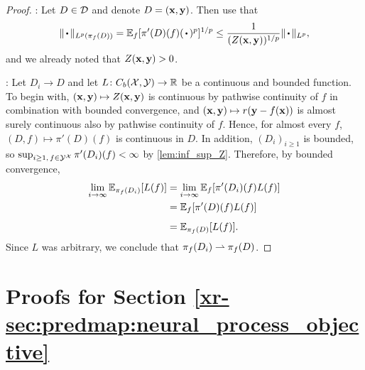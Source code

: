 \documentclass[12pt, twoside]{report}
\newcommand{\xrprefix}[1]{xr-#1}
\begin{document}
\begin{proof}
    :
    Let $D \in \mathcal{D}$ and denote $D = (\mathbf{x}, \mathbf{y})$.
    Then use that
    \begin{equation}
        \norm{\vardot}_{L^p(\pi_f(D))}
        = \E_f[\pi'(D)(f)(\vardot)^p]^{1/p}
        \le \frac{1}{(Z(\vx, \vy))^{1/p}} \norm{\vardot}_{L^p},
    \end{equation}
    and we already noted that $Z(\mathbf{x}, \mathbf{y}) > 0$.

    :
    Let $D_i \to D$ and let $L\colon C_b(\mathcal{X}, \mathcal{Y}) \to \mathbb{R}$ be a continuous and bounded function.
    To begin with, $(\mathbf{x}, \mathbf{y}) \mapsto Z(\mathbf{x}, \mathbf{y})$ is continuous by pathwise continuity of $f$ in combination with bounded convergence, and $(\mathbf{x}, \mathbf{y}) \mapsto r(\mathbf{y} - f(\mathbf{x}))$ is almost surely continuous also by pathwise continuity of $f$.
    Hence, for almost every $f$, $(D, f) \mapsto \pi'(D)(f)$ is continuous in $D$.
    In addition, $(D_i)_{i \ge 1}$ is bounded, so
    $\operatorname*{sup}_{i \ge 1,\, f \in \mathcal{Y}^{\mathcal{X}}} \pi'(D_i)(f) < \infty$
    by \cref{lem:inf_sup_Z}.
    Therefore, by bounded convergence,
    \begin{align}
        \lim_{i \to \infty} \E_{\pi_f(D_i)}[L(f)]
        &= \lim_{i \to \infty} \E_{f}[\pi'(D_i)(f)L(f)] \\
        &= \vphantom{\lim_{i \to \infty}}\E_{f}[ \pi'(D)(f)L(f)] \\
        &= \E_{\pi_f(D)}[L(f)].
    \end{align}
    Since $L$ was arbitrary, we conclude that $\pi_f(D_i) \rightharpoonup \pi_f(D)$.
\end{proof}


\section{Proofs for Section \ref{\xrprefix{sec:predmap:neural_process_objective}}}
\label{sec:proofs_predmap:neural_process_objective}
\end{document}
